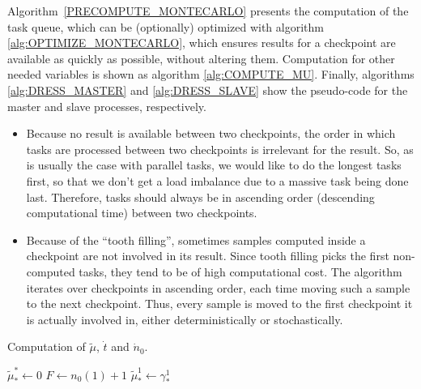\documentclass[./thesis.tex]{subfiles}
\begin{document}
Algorithm~\ref{PRECOMPUTE_MONTECARLO} presents the computation of the task queue, which can be (optionally) optimized with algorithm \ref{alg:OPTIMIZE_MONTECARLO}, which ensures results for a checkpoint are available as quickly as possible, without altering them. Computation for other needed variables is shown as algorithm \ref{alg:COMPUTE_MU}.
Finally, algorithms \ref{alg:DRESS_MASTER} and \ref{alg:DRESS_SLAVE} show the pseudo-code for the master and slave processes, respectively.
\begin{itemize}
\item
Because no result is available between two checkpoints, the order in which tasks are processed between two checkpoints is irrelevant for the result. So, as is usually the case with parallel tasks, we would like to do the longest tasks first, so that we don't get a load imbalance due to a massive task being done last. Therefore, tasks should always be in ascending order (descending computational time) between two checkpoints.
\item
Because of the ``tooth filling'', sometimes samples computed inside a checkpoint are not involved in its result. Since tooth filling picks the first non-computed tasks, they tend to be of high computational cost. The algorithm iterates over checkpoints in ascending order, each time moving such a sample to the next checkpoint. Thus, every sample is moved to the first checkpoint it is actually involved in, either deterministically or stochastically.
\end{itemize}



\begin{algorithm}
	\caption{Computation of $\tilde \mu$, $\dot t$ and $\dot n_0$.}
	\label{alg:COMPUTE_MU}
		$\tilde \mu^*_* \gets 0$ \;
		$F \gets n_0(1)+1$ \;		
		$\tilde \mu^1_* \gets \gamma^1_*$ \;
\end{algorithm}
\end{document}
